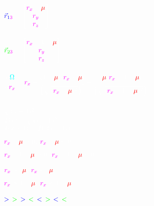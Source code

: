 \documentclass{article}
\newcommand{\dash}{\scalebox{0.5}[1.0]{$-$}}
\begin{document}
$
\color{blue}\vec{r}_{\color{blue}1\color{mag}3}\color{white}=
\begin{bmatrix}
	\color{mag}r_x\color{white}+\color{red}\mu \\
	\color{mag}r_y \\
	\color{mag}r_z
\end{bmatrix}
$\\\\

$
\color{green}\vec{r}_{\color{green}2\color{mag}3}\color{white}=
\begin{bmatrix}
	\color{mag}r_x\color{white}-1+\color{red}\mu \\
	\color{mag}r_y \\
	\color{mag}r_z
\end{bmatrix}
$\\\\

$
\color{white}\cfrac{\partial\color{cyan}\Omega}{\partial \color{mag}r_x}=
\color{mag}r_x\color{white}-
\cfrac{(1-\color{red}\mu\color{white})(\color{mag}r_x\color{white}+\color{red}\mu\color{white})}
{\left( \sqrt{(\color{mag}r_x\color{white}+\color{red}\mu\color{white})^2}   \right)^3}
\color{white}-
\cfrac{\color{red}\mu\color{white}(\color{mag}r_x\color{white}-1+\color{red}\mu\color{white})}
{\left( \sqrt{(\color{mag}r_x\color{white}-1+\color{red}\mu\color{white})^2}   \right)^3}
$\\\\

$\color{white}
\sqrt{(x+1)^2}
$\\

$\color{white}
f(x)=\sqrt{(x+1)^2}
$\\

$\color{white}
f(x+1)=f(\dash(x+1))
$

$\color{mag}r_x\color{white}+\color{red}\mu\color{white}>0,\;
\color{mag}r_x\color{white}+\color{red}\mu\color{white}<0$

$\color{mag}r_x\color{white}-1+\color{red}\mu\color{white}>0,\;
\color{mag}r_x\color{white}-1+\color{red}\mu\color{white}<0$\\\\

$\color{mag}r_x\color{white}>\dash\color{red}\mu\color{white},\;
\color{mag}r_x\color{white}<\dash\color{red}\mu$

$\color{mag}r_x\color{white}>1-\color{red}\mu\color{white},\;
\color{mag}r_x\color{white}<1-\color{red}\mu$

$\color{blue}>\color{white},\color{green}>$
$\color{blue}>\color{white},\color{green}<$
$\color{blue}<\color{white},\color{green}>$
$\color{blue}<\color{white},\color{green}<$
\end{document}
